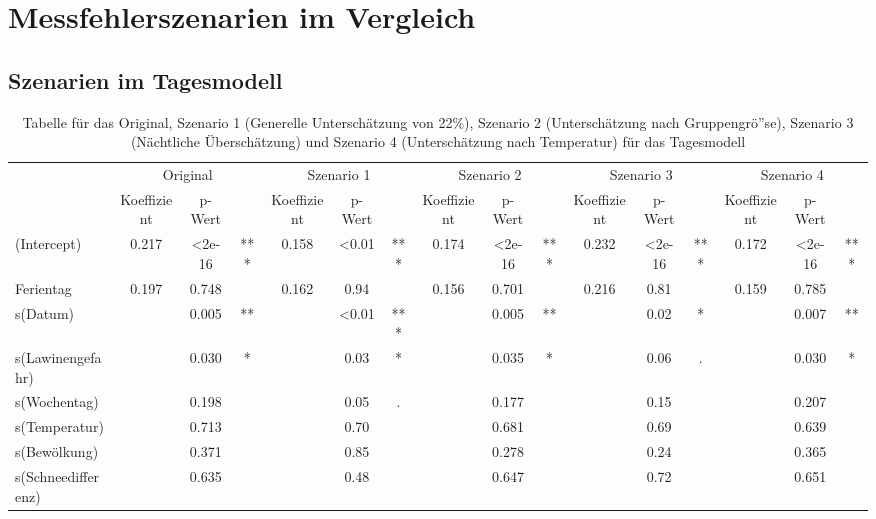 \documentclass[12pt]{scrreprt}
\begin{document}
\section{Messfehlerszenarien im Vergleich}
\subsection{Szenarien im Tagesmodell}
\begin{table}[htbp]
	\centering
	\caption{Tabelle für das Original, Szenario 1 (Generelle Unterschätzung von 22\%), Szenario 2 (Unterschätzung nach Gruppengrö”se), Szenario 3 (Nächtliche Überschätzung) und Szenario 4 (Unterschätzung nach Temperatur) für das Tagesmodell}
	\begin{adjustbox}{max width=\textwidth}
	\begin{tabular}{l|ccc|ccc|ccc|ccc|ccc|}
		\multicolumn{1}{r}{} & 
		\multicolumn{3}{c}{Original} & 
		\multicolumn{3}{c}{Szenario 1} & 
		\multicolumn{3}{c}{Szenario 2} & 
		\multicolumn{3}{c}{Szenario 3} & 
		\multicolumn{3}{c}{Szenario 4} \\
		& Koeffizient & p-Wert &       & Koeffizient & p-Wert &       & Koeffizient & p-Wert &       & Koeffizient & p-Wert &       & Koeffizient & p-Wert &  \\
		\cmidrule{2-16}    (Intercept) & 0.217 & <2e-16 & ***   & 0.158 & <0.01 & ***   & 0.174 & <2e-16 & ***   & 0.232 & <2e-16 & ***   & 0.172 & <2e-16 & *** \\
		Ferientag & 0.197 & 0.748 &       & 0.162 & 0.94  &       & 0.156 & 0.701 &       & 0.216 & 0.81  &       & 0.159 & 0.785 &   \\
		s(Datum) &       & 0.005 & **    &       & <0.01 & ***   &       & 0.005 & **    &       & 0.02  & *     &       & 0.007 & ** \\
		s(Lawinengefahr) &       & 0.030 & *     &       & 0.03  & *     &       & 0.035 & *     &       & 0.06  & .     &       & 0.030 & * \\
		s(Wochentag) &       & 0.198 &       &       & 0.05  & .     &       & 0.177 &       &       & 0.15  &       &       & 0.207 &   \\
		s(Temperatur) &       & 0.713 &       &       & 0.70  &       &       & 0.681 &       &       & 0.69  &       &       & 0.639 &   \\
		s(Bewölkung) &       & 0.371 &       &       & 0.85  &       &       & 0.278 &       &       & 0.24  &       &       & 0.365 &   \\
		s(Schneedifferenz) &       & 0.635 &       &       & 0.48  &       &       & 0.647 &       &       & 0.72  &       &       & 0.651 &   \\
		\cmidrule{2-16}    \end{tabular}%
	\end{adjustbox}
	\label{tab:Szenarien im Tagesmodell}%
\end{table}%
\end{document}
